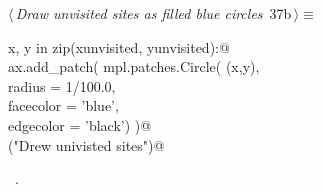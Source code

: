 \documentclass[11.5pt]{report}
\begin{document}
\begin{flushleft} \small\label{scrap48}\raggedright\small
{} $\langle\,${\itshape Draw unvisited sites as filled blue circles}\nobreak\ {\footnotesize {37b}}$\,\rangle\equiv$
\vspace{-1ex}
\begin{list}{}{} \item
\mbox{}\verb@for x, y in zip(xunvisited, yunvisited):@\\
\mbox{}\verb@     ax.add_patch( mpl.patches.Circle( (x,y),\@\\
\mbox{}\verb@                                    radius    = 1/100.0,\@\\
\mbox{}\verb@                                    facecolor = 'blue',\@\\
\mbox{}\verb@                                    edgecolor = 'black')  )@\\
\mbox{}\verb@debug("Drew univisted sites")@\\
\mbox{}\verb@@{\NWsep}
\end{list}
\vspace{-1.5ex}
\footnotesize
\begin{list}{}{\setlength{\itemsep}{-\parsep}\setlength{\itemindent}{-\leftmargin}}
\item \NWtxtMacroRefIn\ .

\item{}
\end{list}
\vspace{4ex}
\end{flushleft}


\vspace{-0.8cm}\newchunk 
\end{document}
